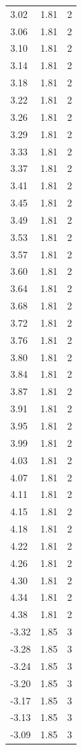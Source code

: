 \begin{longtable}{lrr}
  3.02 & 1.81 & 2 \\
  3.06 & 1.81 & 2 \\
  3.10 & 1.81 & 2 \\
  3.14 & 1.81 & 2 \\
  3.18 & 1.81 & 2 \\
  3.22 & 1.81 & 2 \\
  3.26 & 1.81 & 2 \\
  3.29 & 1.81 & 2 \\
  3.33 & 1.81 & 2 \\
  3.37 & 1.81 & 2 \\
  3.41 & 1.81 & 2 \\
  3.45 & 1.81 & 2 \\
  3.49 & 1.81 & 2 \\
  3.53 & 1.81 & 2 \\
  3.57 & 1.81 & 2 \\
  3.60 & 1.81 & 2 \\
  3.64 & 1.81 & 2 \\
  3.68 & 1.81 & 2 \\
  3.72 & 1.81 & 2 \\
  3.76 & 1.81 & 2 \\
  3.80 & 1.81 & 2 \\
  3.84 & 1.81 & 2 \\
  3.87 & 1.81 & 2 \\
  3.91 & 1.81 & 2 \\
  3.95 & 1.81 & 2 \\
  3.99 & 1.81 & 2 \\
  4.03 & 1.81 & 2 \\
  4.07 & 1.81 & 2 \\
  4.11 & 1.81 & 2 \\
  4.15 & 1.81 & 2 \\
  4.18 & 1.81 & 2 \\
  4.22 & 1.81 & 2 \\
  4.26 & 1.81 & 2 \\
  4.30 & 1.81 & 2 \\
  4.34 & 1.81 & 2 \\
  4.38 & 1.81 & 2 \\
  -3.32 & 1.85 & 3 \\
  -3.28 & 1.85 & 3 \\
  -3.24 & 1.85 & 3 \\
  -3.20 & 1.85 & 3 \\
  -3.17 & 1.85 & 3 \\
  -3.13 & 1.85 & 3 \\
  -3.09 & 1.85 & 3 \\

\end{longtable}
